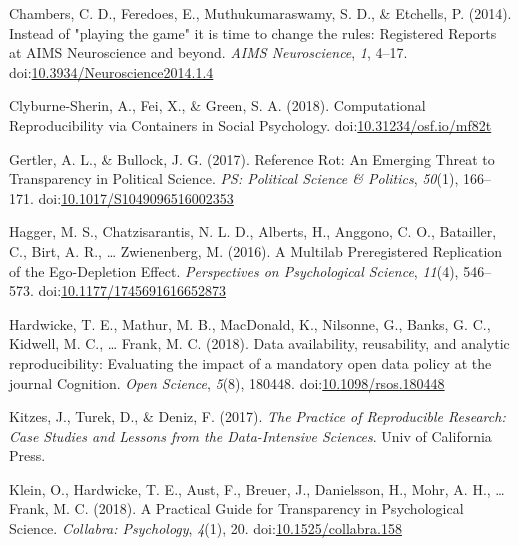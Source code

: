 \documentclass[
  ,jou, a4paper,floatsintext]{apa6}
\begin{document}
\leavevmode\hypertarget{ref-chambers_instead_2014}{}%
Chambers, C. D., Feredoes, E., Muthukumaraswamy, S. D., \& Etchells, P. (2014). Instead of "playing the game" it is time to change the rules: Registered Reports at AIMS Neuroscience and beyond. \emph{AIMS Neuroscience}, \emph{1}, 4--17. doi:\href{https://doi.org/10.3934/Neuroscience2014.1.4}{10.3934/Neuroscience2014.1.4}

\leavevmode\hypertarget{ref-clyburne-sherin_computational_2018}{}%
Clyburne-Sherin, A., Fei, X., \& Green, S. A. (2018). Computational Reproducibility via Containers in Social Psychology. doi:\href{https://doi.org/10.31234/osf.io/mf82t}{10.31234/osf.io/mf82t}

\leavevmode\hypertarget{ref-gertler_reference_2017}{}%
Gertler, A. L., \& Bullock, J. G. (2017). Reference Rot: An Emerging Threat to Transparency in Political Science. \emph{PS: Political Science \& Politics}, \emph{50}(1), 166--171. doi:\href{https://doi.org/10.1017/S1049096516002353}{10.1017/S1049096516002353}

\leavevmode\hypertarget{ref-hagger_multilab_2016}{}%
Hagger, M. S., Chatzisarantis, N. L. D., Alberts, H., Anggono, C. O., Batailler, C., Birt, A. R., \ldots{} Zwienenberg, M. (2016). A Multilab Preregistered Replication of the Ego-Depletion Effect. \emph{Perspectives on Psychological Science}, \emph{11}(4), 546--573. doi:\href{https://doi.org/10.1177/1745691616652873}{10.1177/1745691616652873}

\leavevmode\hypertarget{ref-hardwicke_data_2018}{}%
Hardwicke, T. E., Mathur, M. B., MacDonald, K., Nilsonne, G., Banks, G. C., Kidwell, M. C., \ldots{} Frank, M. C. (2018). Data availability, reusability, and analytic reproducibility: Evaluating the impact of a mandatory open data policy at the journal Cognition. \emph{Open Science}, \emph{5}(8), 180448. doi:\href{https://doi.org/10.1098/rsos.180448}{10.1098/rsos.180448}

\leavevmode\hypertarget{ref-kitzes_practice_2017}{}%
Kitzes, J., Turek, D., \& Deniz, F. (2017). \emph{The Practice of Reproducible Research: Case Studies and Lessons from the Data-Intensive Sciences}. Univ of California Press.

\leavevmode\hypertarget{ref-klein_practical_2018-1}{}%
Klein, O., Hardwicke, T. E., Aust, F., Breuer, J., Danielsson, H., Mohr, A. H., \ldots{} Frank, M. C. (2018). A Practical Guide for Transparency in Psychological Science. \emph{Collabra: Psychology}, \emph{4}(1), 20. doi:\href{https://doi.org/10.1525/collabra.158}{10.1525/collabra.158}
\end{document}

